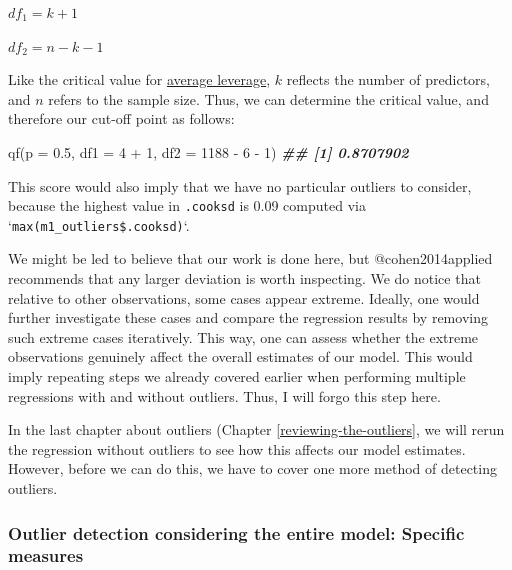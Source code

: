 \documentclass[
]{book}
\newenvironment{Shaded}{\begin{snugshade}}{\end{snugshade}}
\newcommand{\AttributeTok}[1]{\textcolor[rgb]{0.77,0.63,0.00}{#1}}
\newcommand{\DecValTok}[1]{\textcolor[rgb]{0.00,0.00,0.81}{#1}}
\newcommand{\DocumentationTok}[1]{\textcolor[rgb]{0.56,0.35,0.01}{\textbf{\textit{#1}}}}
\newcommand{\FloatTok}[1]{\textcolor[rgb]{0.00,0.00,0.81}{#1}}
\newcommand{\FunctionTok}[1]{\textcolor[rgb]{0.00,0.00,0.00}{#1}}
\newcommand{\NormalTok}[1]{#1}
\newcommand{\SpecialCharTok}[1]{\textcolor[rgb]{0.00,0.00,0.00}{#1}}
\begin{document}
\leavevmode\hypertarget{critical-value-cooks-d}{}%
\(df_1 = k +1\)

\(df_2 = n - k - 1\)

Like the critical value for \protect\hyperlink{average-leverage-equation}{average leverage}, \(k\) reflects the number of predictors, and \(n\) refers to the sample size. Thus, we can determine the critical value, and therefore our cut-off point as follows:

\begin{Shaded}
\begin{Highlighting}[]
\FunctionTok{qf}\NormalTok{(}\AttributeTok{p =} \FloatTok{0.5}\NormalTok{,}
   \AttributeTok{df1 =} \DecValTok{4} \SpecialCharTok{+} \DecValTok{1}\NormalTok{,}
   \AttributeTok{df2 =} \DecValTok{1188} \SpecialCharTok{{-}} \DecValTok{6} \SpecialCharTok{{-}} \DecValTok{1}\NormalTok{)}
\DocumentationTok{\#\# [1] 0.8707902}
\end{Highlighting}
\end{Shaded}

This score would also imply that we have no particular outliers to consider, because the highest value in \texttt{.cooksd} is 0.09 computed via `\texttt{max(m1\_outliers\$.cooksd)}`.

We might be led to believe that our work is done here, but @cohen2014applied recommends that any larger deviation is worth inspecting. We do notice that relative to other observations, some cases appear extreme. Ideally, one would further investigate these cases and compare the regression results by removing such extreme cases iteratively. This way, one can assess whether the extreme observations genuinely affect the overall estimates of our model. This would imply repeating steps we already covered earlier when performing multiple regressions with and without outliers. Thus, I will forgo this step here.

In the last chapter about outliers (Chapter \ref{reviewing-the-outliers}, we will rerun the regression without outliers to see how this affects our model estimates. However, before we can do this, we have to cover one more method of detecting outliers.

\hypertarget{outlier-detection-specific-measures}{%
\subsubsection{Outlier detection considering the entire model: Specific measures}\label{outlier-detection-specific-measures}}
\end{document}
